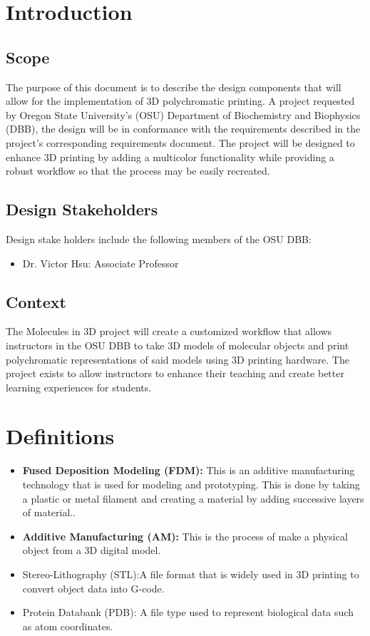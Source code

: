 \documentclass[letterpaper, onecolumn, draftclsnofoot, 10pt, compsoc]{IEEEtran}
\begin{document}
\begin{singlespace}
\section{Introduction}
	\subsection{Scope}
    	The purpose of this document is to describe the design components that will allow for the implementation of 3D polychromatic printing. 
        A project requested by Oregon State University's (OSU) Department of Biochemistry and Biophysics (DBB), the design will be in conformance with the requirements described in the project's corresponding requirements document. 
        The project will be designed to enhance 3D printing by adding a multicolor functionality while providing a robust workflow so that the process may be easily recreated. 
    \subsection{Design Stakeholders}
    	Design stake holders include the following members of the OSU DBB:
    	\begin{itemize}
    	\item Dr. Victor Hsu: Associate Professor
    	\end{itemize}
    \subsection{Context}
    	The Molecules in 3D project will create a customized workflow that allows instructors in the OSU DBB to take 3D models of molecular objects and print polychromatic representations of said models using 3D printing hardware.
        The project exists to allow instructors to enhance their teaching and create better learning experiences for students. 
       
\section{Definitions} %
	\begin{itemize}
		\item\textbf{Fused Deposition Modeling (FDM):} This is an additive manufacturing technology that is used for modeling and prototyping. This is done by taking a plastic or metal filament and creating a material by adding successive layers of material.\cite{fusedep}.
        \item\textbf{Additive Manufacturing (AM):} This is the process of make a physical object from a 3D digital model.\cite{additiveman}
       \item {Stereo-Lithography (STL):}A file format that is widely used in 3D printing to convert object data into G-code.
      \item {Protein Databank (PDB):} A file type used to represent biological data such as atom coordinates.
	\end{itemize}

\end{singlespace}
\end{document}
